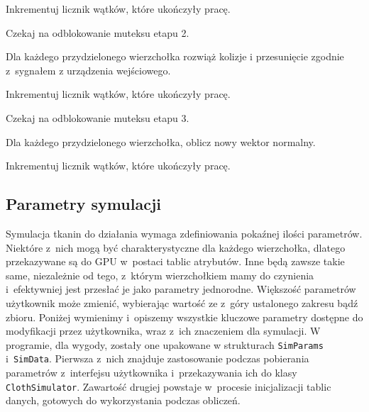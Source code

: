 \begin{algorithm}[H]
{				Inkrementuj licznik wątków, które ukończyły pracę.
				
				Czekaj na odblokowanie muteksu etapu 2.
				
				Dla każdego przydzielonego wierzchołka rozwiąż kolizje i przesunięcie zgodnie z~sygnałem z urządzenia wejściowego.
				
				Inkrementuj licznik wątków, które ukończyły pracę.
				
				Czekaj na odblokowanie muteksu etapu 3.
				
				Dla każdego przydzielonego wierzchołka, oblicz nowy wektor normalny.
				
				Inkrementuj licznik wątków, które ukończyły pracę.
			}
			
			\Indm
		\end{algorithm}
		
		\subsection{Parametry symulacji}
		\label{t:symulacja:dzialanie:parametry}
			
		
		Symulacja tkanin do działania wymaga zdefiniowania pokaźnej ilości parametrów. Niektóre z~nich mogą być charakterystyczne dla każdego wierzchołka, dlatego przekazywane są do GPU w~postaci tablic atrybutów. Inne będą zawsze takie same, niezależnie od tego, z~którym wierzchołkiem mamy do czynienia i~efektywniej jest przesłać je jako parametry jednorodne. Większość parametrów użytkownik może zmienić, wybierając wartość ze z~góry ustalonego zakresu bądź zbioru. Poniżej wymienimy i~opiszemy wszystkie kluczowe parametry dostępne do modyfikacji przez użytkownika, wraz z~ich znaczeniem dla symulacji. W programie, dla wygody, zostały one upakowane w strukturach \texttt{SimParams} i~\texttt{SimData}. Pierwsza z~nich znajduje zastosowanie podczas pobierania parametrów z~interfejsu użytkownika i~przekazywania ich do klasy \texttt{ClothSimulator}. Zawartość drugiej powstaje w~procesie inicjalizacji tablic danych, gotowych do wykorzystania podczas obliczeń.
		
